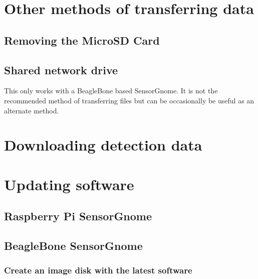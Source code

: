 \documentclass[
]{book}
\begin{document}
\hypertarget{other-methods-of-transferring-data}{%
\chapter{Other methods of transferring data}\label{other-methods-of-transferring-data}}

\hypertarget{removing-the-microsd-card}{%
\section{Removing the MicroSD Card}\label{removing-the-microsd-card}}

\hypertarget{shared-network-drive}{%
\section{Shared network drive}\label{shared-network-drive}}

This only works with a BeagleBone based SensorGnome. It is not the recommended method of transferring files but can be occasionally be useful as an alternate method.

\hypertarget{downloading-detection-data}{%
\chapter{Downloading detection data}\label{downloading-detection-data}}

\hypertarget{updating-software}{%
\chapter{Updating software}\label{updating-software}}

\hypertarget{raspberry-pi-sensorgnome-1}{%
\section{Raspberry Pi SensorGnome}\label{raspberry-pi-sensorgnome-1}}

\hypertarget{beaglebone-sensorgnome-1}{%
\section{BeagleBone SensorGnome}\label{beaglebone-sensorgnome-1}}

\hypertarget{create-an-image-disk-with-the-latest-software}{%
\subsection{Create an image disk with the latest software}\label{create-an-image-disk-with-the-latest-software}}
\end{document}
